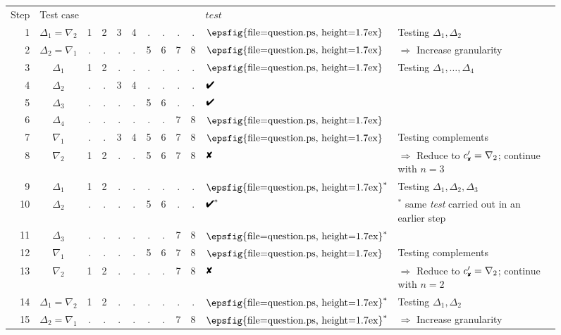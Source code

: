 \documentclass{acm_proc_article-sp}
\newcommand{\PASS}{\text{\ding{52}}\xspace}
\newcommand{\FAIL}{\text{\ding{56}}\xspace}
\newcommand{\UNRESOLVED}{\lower0.1ex\hbox{\epsfig{file=question.ps, 
      height=1.7ex}}}
\newcommand{\dfail}{{c'_{\scriptscriptstyle \FAIL}}}
\newcommand{\test}{\textit{test}\xspace}
\theoremstyle{plain}
\begin{document}
\begin{figure*}[t]
  \begin{center}%
    \begin{tabular}{r|c|cccccccc|ll}
      Step & \multicolumn{9}{l|}{Test case} & $\test$ \\
      \cline{1-11}
      1 & $\Delta_1 = \nabla_2$ & 1 & 2 & 3 & 4 & . & . & . & . & $\UNRESOLVED$ & Testing $\Delta_1, \Delta_2$\\
      2 & $\Delta_2 = \nabla_1$ & . & . & . & . & 5 & 6 & 7 & 8 & $\UNRESOLVED$ & 
          $\Rightarrow$ Increase granularity \\ \cline{1-11}
      3 & $\Delta_1$ & 1 & 2 & . & . & . & . & . & . & $\UNRESOLVED$ & Testing $\Delta_1, \ldots, \Delta_4$ \\
      4 & $\Delta_2$ & . & . & 3 & 4 & . & . & . & . & $\PASS$ \\ 
      5 & $\Delta_3$ & . & . & . & . & 5 & 6 & . & . & $\PASS$ \\
      6 & $\Delta_4$ & . & . & . & . & . & . & 7 & 8 & $\UNRESOLVED$ \\
      7 & $\nabla_1$ & . & . & 3 & 4 & 5 & 6 & 7 & 8 & $\UNRESOLVED$ & Testing complements \\
      8 & $\nabla_2$ & 1 & 2 & . & . & 5 & 6 & 7 & 8 & $\FAIL$ & 
          $\Rightarrow$ Reduce to $\dfail = \nabla_2$; continue with $n = 3$ \\ \cline{1-11}
      9 & $\Delta_1$ & 1 & 2 & . & . & . & . & . & . & $\UNRESOLVED^*$ & Testing $\Delta_1, \Delta_2, \Delta_3$ \\
     10 & $\Delta_2$ & . & . & . & . & 5 & 6 & . & . & $\PASS^*$ &     ${}^*$ same \test carried out in an earlier step \\
     11 & $\Delta_3$ & . & . & . & . & . & . & 7 & 8 & $\UNRESOLVED^*$ \\
     12 & $\nabla_1$ & . & . & . & . & 5 & 6 & 7 & 8 & $\UNRESOLVED$ & Testing complements \\
     13 & $\nabla_2$ & 1 & 2 & . & . & . & . & 7 & 8 & $\FAIL$ & 
        $\Rightarrow$ Reduce to $\dfail = \nabla_2$; continue with $n = 2$ \\ \cline{1-11}
     14 & $\Delta_1 = \nabla_2$ & 1 & 2 & . & . & . & . & . & . & $\UNRESOLVED^*$ & Testing $\Delta_1, \Delta_2$ \\
     15 & $\Delta_2 = \nabla_1$ & . & . & . & . & . & . & 7 & 8 & $\UNRESOLVED^*$ & $\Rightarrow$ Increase granularity \\ \cline{1-11}

\end{tabular}
\end{center}
\end{figure*}
\end{document}
